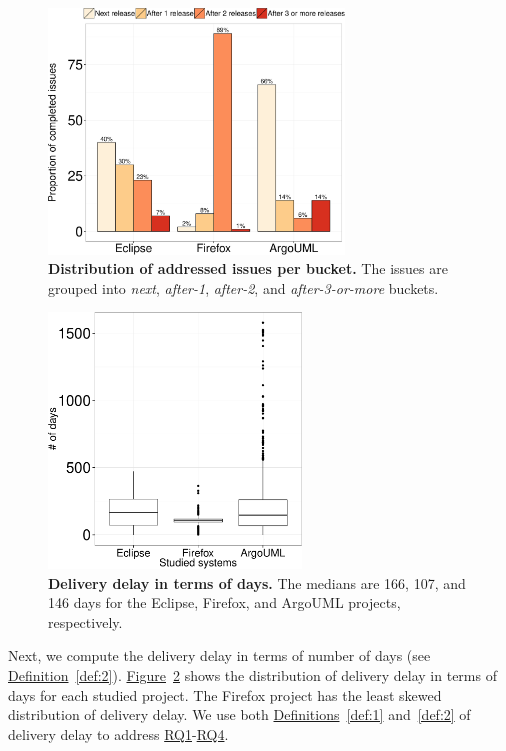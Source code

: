 \begin{figure}
	\centering
	\includegraphics[width=0.7\textwidth]
	{chapters/chapter4/figures/CS_rq1-datasets.pdf}
	\caption{\textbf{Distribution of addressed issues per bucket.} The issues are
		grouped into \textit{next}, \textit{after-1}, \textit{after-2}, and
	\textit{after-3-or-more} buckets.}
	\label{ch4:fig:fixToIntegration}
\end{figure}

\begin{figure}
	\centering
	\includegraphics[width=0.60\textwidth,keepaspectratio]
	{chapters/chapter4/figures/boxplot-days-per-system.pdf}
	\caption{\textbf{Delivery delay in terms of days.} The medians 
		are 166, 107, and 146 days for the Eclipse, Firefox, and
		ArgoUML projects, respectively.
	}
	\label{ch4:fig:beanplot_days}
\end{figure}

Next, we compute the delivery delay in terms of number of days (see
\hyperref[def:2]{Definition}~\ref{def:2}).
\hyperref[ch4:fig:beanplot_days]{Figure}~\ref{ch4:fig:beanplot_days} shows the
distribution of delivery delay in terms of days for each studied project. The
Firefox project has the least skewed distribution of delivery delay. We use both
\hyperref[def:1]{Definitions}~\ref{def:1} and~\ref{def:2} of delivery delay to
address \hyperref[ch4:rq1]{RQ1}-\hyperref[ch4:rq4]{RQ4}.   

